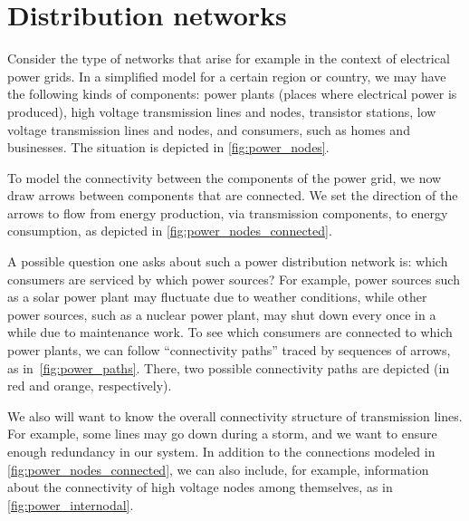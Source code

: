 

\section{Distribution networks}\label{sec:connection-distribution-networks}

Consider the type of networks that arise for example in the context of electrical power grids. In a simplified model for a certain region or country, we may have the following kinds of components: power plants (places where electrical power is produced), high voltage transmission lines and nodes, transistor stations, low voltage transmission lines and nodes, and consumers, such as homes and businesses. The situation is depicted in \cref{fig:power_nodes}.

\begin{figure*}[h!]
  \centering
  \caption{Components of electrical power grids.}
  \label{fig:power_nodes}
\end{figure*}
To model the connectivity between the components of the power grid, we now draw arrows between components that are connected. We set the direction of the arrows to flow from energy production, via transmission components, to energy consumption, as depicted in \cref{fig:power_nodes_connected}.
\begin{figure*}[h!]
  \centering
  \caption{Connectivity between components in electric power grids.}
  \label{fig:power_nodes_connected}
\end{figure*}

A possible question one asks about such a power distribution network is: which consumers are serviced by which power sources? For example, power sources such as a solar power plant may fluctuate due to weather conditions, while other power sources, such as a nuclear power plant, may shut down every once in a while due to maintenance work. To see which consumers are connected to which power plants, we can follow ``connectivity paths'' traced by sequences of arrows, as in~\cref{fig:power_paths}. There, two possible connectivity paths are depicted (in red and orange, respectively).


\begin{figure*}[h!]
  \centering
  \caption{Connection between consumers and power plants.}
  \label{fig:power_paths}
\end{figure*}


We also will want to know the overall connectivity structure of transmission lines. For example, some lines may go down during a storm, and we want to ensure enough redundancy in our system. In addition to the connections modeled in \cref{fig:power_nodes_connected}, we can also include, for example, information about the connectivity of high voltage nodes among themselves, as in \cref{fig:power_internodal}.

